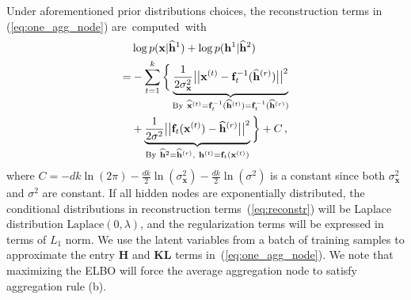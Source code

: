 \documentclass[twoside]{article}
\begin{document}
Under aforementioned prior distributions choices,  the reconstruction terms in (\ref{eq:one_agg_node}) are~computed~with
\begin{align}\notag
& \log p(\mathbf{x}|\widehat{\mathbf{h}}^1) + \log p(\mathbf{h}^1|\widehat{\mathbf{h}}^2) \\ \notag
=&-\sum_{t=1}^k\bigg\{ \underbrace{\frac{1}{2\sigma^2_{\mathbf{x}}}\big|\big| \mathbf{x}^{(t)} - \mathbf{f}_t^{-1}(\widehat{\mathbf{h}}^{(r)})\big|\big|^2 }_{\textrm{By} \  \widehat{\mathbf{x}}^{(t)}=\mathbf{f}_t^{-1}(\widehat{\mathbf{h}}^{(t)})=\mathbf{f}_t^{-1}(\widehat{\mathbf{h}}^{(r)})} \\ \label{eq:reconstr}
&+  \underbrace{\frac{1}{2\sigma^2}\big|\big|  \mathbf{f}_t(\mathbf{x}^{(t)}) - \widehat{\mathbf{h}}^{(r)}\big|\big|^2}_{\textrm{By} \  \widehat{\mathbf{h}}^{2}= \widehat{\mathbf{h}}^{(r)}, \  \mathbf{h}^{(t)} = \mathbf{f}_t(\mathbf{x}^{(t)})} \bigg\} +C \,,
\end{align} 
where $C=-dk\ln(2\pi)-\frac{dk}{2}\ln(\sigma_{\mathbf{x}}^2)-\frac{dk}{2}\ln(\sigma^2)$ is a constant since both  $\sigma^2_{\mathbf{x}}$ and $\sigma^2$ are constant.
If all hidden nodes are exponentially distributed, the conditional distributions in reconstruction terms~(\ref{eq:reconstr}) will be Laplace distribution $\textrm{Laplace}(0, \lambda)$, and the regularization terms will be expressed in terms of $L_1$ norm. 
We use the latent variables from a batch of training samples to approximate the entry \textbf{H} and \textbf{KL} terms in~(\ref{eq:one_agg_node}). 
We note that maximizing the ELBO will force the average aggregation node to satisfy aggregation rule (b). 
\end{document}
